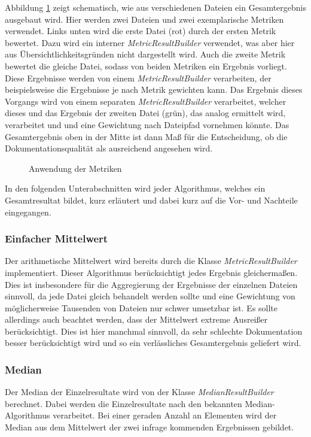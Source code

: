 Abbildung \ref{fig:metrics_apply} zeigt schematisch, wie aus verschiedenen Dateien ein Gesamtergebnis ausgebaut wird. Hier werden zwei Dateien und zwei exemplarische Metriken verwendet. Links unten wird die erste Datei (rot) durch der ersten Metrik bewertet. Dazu wird ein interner \textit{MetricResultBuilder} verwendet, was aber hier aus Übersichtlichkeitsgründen nicht dargestellt wird. Auch die zweite Metrik bewertet die gleiche Datei, sodass von beiden Metriken ein Ergebnis vorliegt. Diese Ergebnisse werden von einem \textit{MetricResultBuilder} verarbeiten, der beispielsweise die Ergebnisse je nach Metrik gewichten kann. Das Ergebnis dieses Vorgangs wird von einem separaten \textit{MetricResultBuilder} verarbeitet, welcher dieses und das Ergebnis der zweiten Datei (grün), das analog ermittelt wird, verarbeitet und und eine Gewichtung nach Dateipfad vornehmen könnte. Das Gesamtergebnis oben in der Mitte ist dann Maß für die Entscheidung, ob die Dokumentationsqualität als ausreichend angesehen wird. 
\begin{figure}[ht!]
\fontsize{7}{10}\selectfont
    \centering

    \caption{Anwendung der Metriken}
    \label{fig:metrics_apply}
\end{figure}
 

In den folgenden Unterabschnitten wird jeder Algorithmus, welches ein Gesamtresultat bildet, kurz erläutert und dabei kurz auf die Vor- und Nachteile eingegangen. 

\subsubsection{Einfacher Mittelwert}
Der arithmetische Mittelwert wird bereits durch die Klasse \textit{MetricResultBuilder} implementiert. Dieser Algorithmus berücksichtigt jedes Ergebnis gleichermaßen. Dies ist insbesondere für die Aggregierung der Ergebnisse der einzelnen Dateien sinnvoll, da jede Datei gleich behandelt werden sollte und eine Gewichtung von möglicherweise Tausenden von Dateien nur schwer umsetzbar ist. Es sollte allerdings auch beachtet werden, dass der Mittelwert extreme Ausreißer berücksichtigt. Dies ist hier manchmal sinnvoll, da sehr schlechte Dokumentation besser berücksichtigt wird und so ein verlässliches Gesamtergebnis geliefert wird.


\subsubsection{Median}
Der Median der Einzelresultate wird von der Klasse \textit{MedianResultBuilder} berechnet. Dabei werden die Einzelresultate nach den bekannten Median-Algorithmus verarbeitet. Bei einer geraden Anzahl an Elementen wird der Median aus dem Mittelwert der zwei infrage kommenden Ergebnissen gebildet. 

